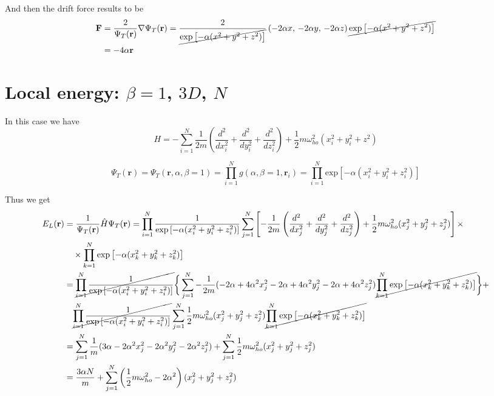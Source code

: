 \documentclass{article}
\begin{document}
And then the drift force results to be
\begin{align*}
    \mathbf{F} &= \frac{2}{\Psi_T(\mathbf{r})} \nabla\Psi_T(\mathbf{r}) = \frac{2}{\cancel{\text{exp}\left[-\alpha (x^2 + y^2 + z^2) \right]}} \left( -2\alpha x,\, - 2\alpha y,\, -2\alpha z\right) \cancel{\text{exp}\left[-\alpha (x^2 + y^2 + z^2) \right]} \\
    &= -4\alpha \mathbf{r} 
\end{align*}



\section{Local energy: $\beta = 1$, $3D$, $N$}
In this case we have
\begin{equation*}
     H = -\sum_{i=1}^N \frac{1}{2m} \left( \frac{d^2}{dx_i^2} + \frac{d^2}{dy_i^2} + \frac{d^2}{dz_i^2} \right) + \frac{1}{2} m \omega_{ho}^2 (x_i^2 + y_i^2 + z^2)
\end{equation*}

\begin{equation*}
    \Psi_T(\mathbf{r})=\Psi_T(\mathbf{r},\alpha,\beta=1)
    = \prod_{i=1}^N g(\alpha,\beta=1,\mathbf{r}_i) = \prod_{i=1}^N \text{exp}\left[-\alpha (x_i^2 + y_i^2 + z_i^2) \right]
\end{equation*}

Thus we get
\begin{align*}
    E_L(\mathbf{r}) &= \frac{1}{\Psi_T(\mathbf{r})} \hat{H} \Psi_T(\mathbf{r}) = \prod_{i=1}^N \frac{1}{\text{exp}\left[-\alpha (x_i^2 + y_i^2 + z_i^2) \right]} \sum_{j=1}^N \left[ -\frac{1}{2m} \left( \frac{d^2}{dx_j^2} + \frac{d^2}{dy_j^2} + \frac{d^2}{dz_j^2} \right) + \frac{1}{2} m \omega_{ho}^2 (x_j^2 + y_j^2 + z_j^2) \right] \times \\
    &\quad \times \prod_{k=1}^N \text{exp}\left[-\alpha (x_k^2 + y_k^2 + z_k^2) \right] \\
    &= \cancel{\prod_{i=1}^N \frac{1}{\text{exp}\left[-\alpha (x_i^2 + y_i^2 + z_i^2) \right]} }
    \bigg\{ \sum_{j=1}^N -\frac{1}{2m}  (-2\alpha + 4 \alpha^2 x_j^2 - 2\alpha + 4\alpha^2 y_j^2 - 2\alpha + 4\alpha^2 z_j^2)  \cancel{ \prod_{k=1}^N \text{exp}\left[-\alpha (x_k^2 + y_k^2 + z_k^2) \right]} \bigg\} + \\
    &\quad \cancel{\prod_{i=1}^N \frac{1}{\text{exp}\left[-\alpha (x_i^2 + y_i^2 + z_i^2) \right]}} \sum_{j=1}^N \frac{1}{2} m \omega_{ho}^2 (x_j^2 + y_j^2 + z_j^2)  \cancel{\prod_{k=1}^N \text{exp}\left[-\alpha (x_k^2 + y_k^2 + z_k^2) \right]} \\
    &= \sum_{j=1}^N \frac{1}{m}  ( 3\alpha - 2 \alpha^2 x_j^2 - 2\alpha^2 y_j^2 - 2\alpha^2 z_j^2) +  \sum_{j=1}^N \frac{1}{2} m \omega_{ho}^2 (x_j^2 + y_j^2 + z_j^2) \\
    &= \frac{3\alpha N}{m} + \sum_{j=1}^{N} \left( \frac{1}{2} m \omega_{ho}^2 - 2\alpha^2 \right) (x_j^2 + y_j^2 + z_j^2)
\end{align*}
\end{document}
